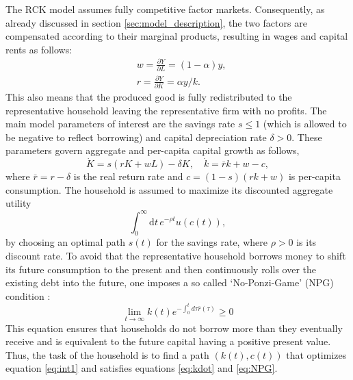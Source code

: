 The RCK model assumes fully competitive factor markets. Consequently, as already discussed in section \ref{sec:model_description}, the two factors are compensated according to their marginal products, resulting in wages and capital rents as follows:
\begin{align}
  &w = \frac{\partial Y}{\partial L} = (1 - \alpha) y, \label{eq:wages}\\
  &r = \frac{\partial Y}{\partial K} = \alpha y /k. \label{eq:capital_rents}
\end{align}
This also means that the produced good is fully redistributed to the representative household leaving the representative firm with no profits.
The main model parameters of interest are the savings rate $s \le 1$ (which is allowed to be negative to reflect borrowing) 
and capital depreciation rate $\delta > 0$. These parameters govern aggregate and per-capita capital growth as follows, 
\begin{equation}
        \dot{K} = s(rK + wL) - \delta K,
        \quad \dot k = \bar{r}k + w - c,
\label{eq:kdot}
\end{equation}
where $\bar{r}=r-\delta$ is the real return rate and $c=(1-s)(rk+w)$ is per-capita consumption.
The household is assumed to maximize its discounted aggregate utility
\begin{equation}
        \int_0^{\infty} \! \mathrm{d}t \, e^{-\rho t} u(c(t)), 
        \label{eq:int1}
\end{equation}
by choosing an optimal path $s(t)$ for the savings rate, where $\rho>0$ is its discount rate.
To avoid that the representative household borrows money to shift its future consumption to the present and then continuously rolls over the existing debt into the future, one imposes a so called `No-Ponzi-Game' (NPG) condition \citep[p. 292]{Acemoglu2009}:
\begin{equation}
  \lim_{t \rightarrow \infty} k(t) e^{-\int_{0}^{t}d\tau \bar{r}(\tau)} \geq 0
  \label{eq:NPG}
\end{equation}
This equation ensures that households do not borrow more than they eventually receive and is equivalent to the future capital having a positive present value.
Thus, the task of the household is to find a path $(k(t),c(t))$ that optimizes equation \eqref{eq:int1} and satisfies equations \eqref{eq:kdot}  and \eqref{eq:NPG}.

